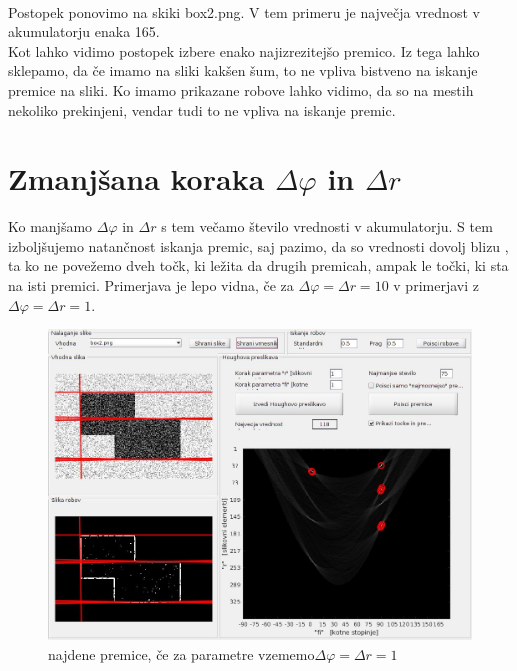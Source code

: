 \documentclass[12pt,a4paper]{article}
\begin{document}
\\
Postopek ponovimo na skiki box2.png. V tem primeru je največja vrednost v akumulatorju enaka 165.\\

Kot lahko vidimo postopek izbere enako najizrezitejšo premico. Iz tega lahko sklepamo, da če imamo na sliki kakšen šum, to ne vpliva bistveno na iskanje premice na sliki. Ko imamo prikazane robove lahko vidimo, da so na mestih nekoliko prekinjeni, vendar tudi to ne vpliva na iskanje premic. 
\section{Zmanjšana koraka $\Delta \varphi$ in $\Delta r$}
Ko manjšamo $\Delta \varphi$ in $\Delta r$ s tem večamo število vrednosti v akumulatorju. S tem izboljšujemo natančnost iskanja premic, saj pazimo, da so vrednosti dovolj \textgravedbl blizu \textacutedbl, ta ko ne povežemo dveh točk, ki ležita da drugih premicah, ampak le točki, ki sta na isti premici. Primerjava je lepo vidna, če za $\Delta \varphi = \Delta r = 10$ v primerjavi z $\Delta \varphi = \Delta r = 1$. 
\begin{figure}[h!]
  \begin{center}
    \includegraphics[scale = 0.3]{r1.jpg}
    \caption{najdene premice, če za parametre vzememo$\Delta \varphi = \Delta r = 1$ }
    \label{fig:}
  \end{center}
\end{figure}
\end{document}
